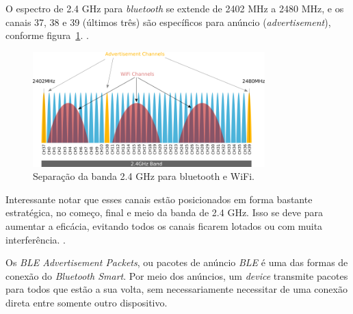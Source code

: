 \documentclass[
		12pt,				%
		openright,			%
		oneside,			%
		a4paper,			%
		chapter=TITLE,		%
		english,			%
		brazil				%
	]{abntex2}
\begin{document}
\begin{table}[htb]
\end{table}

O espectro de 2.4 GHz para \textit{bluetooth} se extende de 2402 MHz a 2480 MHz, e os canais 37, 38 e 39 (últimos três) são específicos para anúncio (\textit{advertisement}), conforme figura~\ref{fig:banda-channels}.  \cite{ble-packets}. 

\begin{figure}[htb]
	\caption{\label{fig:banda-channels}Separação da banda 2.4 GHz para bluetooth e WiFi.}
	\begin{center}
		\includegraphics[width=0.8\textwidth]{img/banda-2-4.png}
	\end{center}
\end{figure}

Interessante notar que esses canais estão posicionados em forma bastante estratégica, no começo, final e meio da banda de 2.4 GHz. Isso se deve para aumentar a eficácia, evitando todos os canais ficarem lotados ou com muita interferência. \cite{ble-packets}. 

Os \textit{BLE Advertisement Packets}, ou pacotes de anúncio \textit{BLE} é uma das formas de conexão do \textit{Bluetooth Smart}. Por meio dos anúncios, um \textit{device} transmite pacotes para todos que estão a sua volta, sem necessariamente necessitar de uma conexão direta entre somente outro dispositivo.
\end{document}
